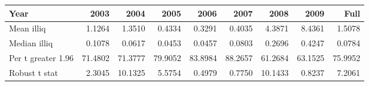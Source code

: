 \begin{tabular}{l|rrrrrrrr}
\toprule
Year & 2003 & 2004 & 2005 & 2006 & 2007 & 2008 & 2009 & Full \\
\midrule
Mean illiq & 1.1264 & 1.3510 & 0.4334 & 0.3291 & 0.4035 & 4.3871 & 8.4361 & 1.5078 \\
Median illiq & 0.1078 & 0.0617 & 0.0453 & 0.0457 & 0.0803 & 0.2696 & 0.4247 & 0.0784 \\
Per t greater 1.96 & 71.4802 & 71.3777 & 79.9052 & 83.8984 & 88.2657 & 61.2684 & 63.1525 & 75.9952 \\
Robust t stat & 2.3045 & 10.1325 & 5.5754 & 0.4979 & 0.7750 & 10.1433 & 0.8237 & 7.2061 \\
\bottomrule
\end{tabular}
